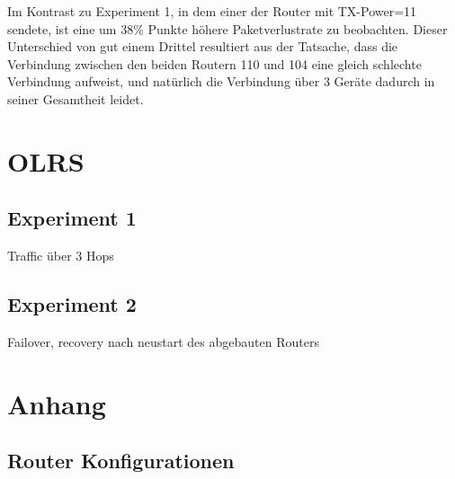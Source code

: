 \documentclass[10pt]{scrartcl}
\begin{document}
	Im Kontrast zu Experiment 1, in dem einer der Router mit TX-Power=11 sendete, ist eine um 38\% Punkte höhere Paketverlustrate zu beobachten. Dieser Unterschied von gut einem Drittel resultiert aus der Tatsache, dass die Verbindung zwischen den beiden Routern 110 und 104 eine gleich schlechte Verbindung aufweist, und natürlich die Verbindung über 3 Geräte dadurch in seiner Gesamtheit leidet.

\section{OLRS}
	\subsection{Experiment 1}
	Traffic über 3 Hops	
	
	\subsection{Experiment 2}
	Failover, recovery nach neustart des abgebauten Routers


\section{Anhang}
	\subsection{Router Konfigurationen}
			
			
			
			
			
		
			
		
\end{document}
